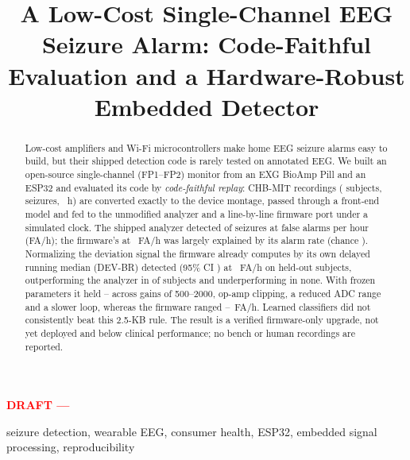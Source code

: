 \documentclass[conference,letterpaper]{IEEEtran}
\newcommand{\pilotbanner}{\textcolor{red}{\textbf{DRAFT --- \PilotNote}}}
\newcommand{\pilotbanner}{}
\begin{document}
\title{A Low-Cost Single-Channel EEG Seizure Alarm: Code-Faithful Evaluation and a Hardware-Robust Embedded Detector}

\author{
\and
{}
}

\maketitle
\pilotbanner

\begin{abstract}
Low-cost amplifiers and Wi-Fi microcontrollers make home EEG seizure alarms easy to build, but their shipped detection code is rarely tested on annotated EEG. We built an open-source single-channel (FP1--FP2) monitor from an EXG BioAmp Pill and an ESP32 and evaluated its code by \emph{code-faithful replay}: CHB-MIT recordings (\NSubj{} subjects, \NSz{} seizures, \NHours{}~h) are converted exactly to the device montage, passed through a front-end model and fed to the unmodified analyzer and a line-by-line firmware port under a simulated clock. The shipped analyzer detected \PyBSens{} of seizures at \PyBFAh{} false alarms per hour (FA/h); the firmware's \FwBSens{} at \FwBFAh{}~FA/h was largely explained by its alarm rate (chance \FwBNull{}). Normalizing the deviation signal the firmware already computes by its own delayed running median (DEV-BR) detected \DevASens{} (95\% CI \DevACI{}) at \DevAFAh{}~FA/h on held-out subjects, outperforming the analyzer in \TestDevPyBetter{} of \TestDevPyN{} subjects and underperforming in none. With frozen parameters it held \HwDevSensMin{}--\HwDevSensMax{} across gains of 500--2000, op-amp clipping, a reduced ADC range and a slower loop, whereas the firmware ranged \HwFwFAMin{}--\HwFwFAMax{}~FA/h. Learned classifiers did not consistently beat this 2.5-KB rule. The result is a verified firmware-only upgrade, not yet deployed and below clinical performance; no bench or human recordings are reported.
\end{abstract}

\begin{IEEEkeywords}
seizure detection, wearable EEG, consumer health, ESP32, embedded signal processing, reproducibility
\end{IEEEkeywords}
\end{document}
